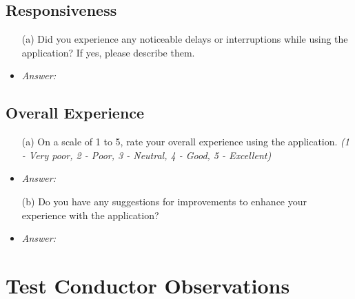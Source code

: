 \documentclass{article}
\begin{document}
\subsection*{\textbf{Responsiveness}}
  \begin{itemize}
    \item[(a)] Did you experience any noticeable delays or interruptions while
    using the application? If yes, please describe them.
    \item \emph{Answer:}
  \end{itemize}

\subsection*{\textbf{Overall Experience}}
  \begin{itemize}
    \item[(a)] On a scale of 1 to 5, rate your overall experience using the
    application. \textit{(1 - Very poor, 2 - Poor, 3 - Neutral, 4 - Good, 5 -
    Excellent)}
    \item \emph{Answer:}
    \item[(b)] Do you have any suggestions for improvements to enhance your
    experience with the application?
    \item \emph{Answer:}
  \end{itemize}

\section{Test Conductor Observations}
\end{document}
